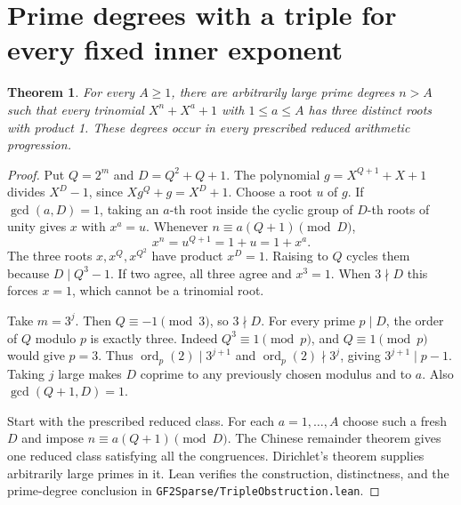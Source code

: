 \documentclass[11pt]{article}
\newtheorem{theorem}{Theorem}
\newcommand{\ord}{\operatorname{ord}}
\begin{document}
\section{Prime degrees with a triple for every fixed inner exponent}
\begin{theorem}\label{thm:fixed-tap-triples}
For every \(A\ge1\), there are arbitrarily large prime degrees \(n>A\)
such that every trinomial \(X^n+X^a+1\) with \(1\le a\le A\) has
three distinct roots with product 1. These degrees occur in every
prescribed reduced arithmetic progression.
\end{theorem}
\begin{proof}
Put \(Q=2^m\) and \(D=Q^2+Q+1\). The polynomial \(g=X^{Q+1}+X+1\)
divides \(X^D-1\), since \(Xg^Q+g=X^D+1\).
Choose a root \(u\) of \(g\). If \(\gcd(a,D)=1\), taking an
\(a\)-th root inside the cyclic group of \(D\)-th roots of unity
gives \(x\) with \(x^a=u\). Whenever \(n\equiv a(Q+1)\pmod D\),
\[
                      x^n=u^{Q+1}=1+u=1+x^a .
\]
The three roots \(x,x^Q,x^{Q^2}\) have product \(x^D=1\).
Raising to \(Q\) cycles them because \(D\mid Q^3-1\).
If two agree, all three agree and \(x^3=1\). When \(3\nmid D\)
this forces \(x=1\), which cannot be a trinomial root.

Take \(m=3^j\). Then \(Q\equiv-1\pmod3\), so \(3\nmid D\).
For every prime \(p\mid D\), the order of \(Q\) modulo \(p\) is exactly
three. Indeed \(Q^3\equiv1\pmod p\), and \(Q\equiv1\pmod p\)
would give \(p=3\). Thus \(\ord_p(2)\mid 3^{j+1}\) and
\(\ord_p(2)\nmid 3^j\), giving \(3^{j+1}\mid p-1\).
Taking \(j\) large makes \(D\) coprime to any previously chosen
modulus and to \(a\). Also \(\gcd(Q+1,D)=1\).

Start with the prescribed reduced class. For each \(a=1,\ldots,A\)
choose such a fresh \(D\) and impose \(n\equiv a(Q+1)\pmod D\).
The Chinese remainder theorem gives one reduced class satisfying all
the congruences. Dirichlet's theorem supplies arbitrarily large primes in it.
Lean verifies the construction, distinctness, and the prime-degree conclusion
in \nolinkurl{GF2Sparse/TripleObstruction.lean}.
\end{proof}
\end{document}
